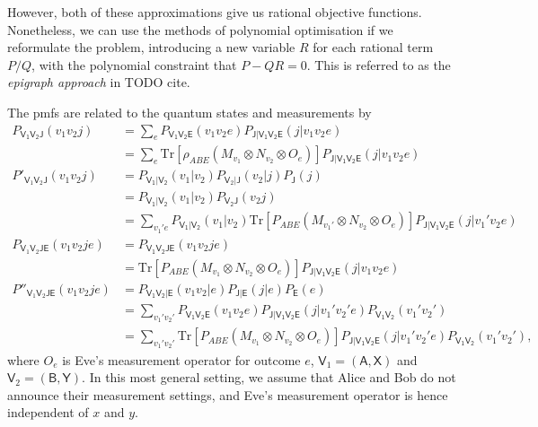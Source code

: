 \documentclass[10pt, a4paper]{article}
\numberwithin{equation}{section} %
\theoremstyle{definition}
\theoremstyle{plain}
\newcommand{\?}{\mathrel{?}} %
\newcommand{\Tr}{\mathrm{Tr}} %
\newcommand{\crv}[1]{\mathsf{#1}}
\begin{document}
    However, both of these approximations give us rational objective functions. Nonetheless, we can use the methods of polynomial optimisation if we reformulate the problem, introducing a new variable \(R\) for each rational term \(P/Q\), with the polynomial constraint that \(P - QR = 0\). This is referred to as the \emph{epigraph approach} in TODO cite.

    The pmfs are related to the quantum states and measurements by
    \begin{align}
      P_{\crv{V_1V_2J}}(v_1v_2j) &= \sum_{e}  P_{\crv{V_1V_2E}}(v_1v_2e) P_{\crv{J|V_1V_2E}}(j|v_1v_2e) \\
                                 &= \sum_{e} \Tr\left[\rho_{ABE} \left(M_{v_1} \otimes N_{v_2} \otimes O_e\right)\right] P_{\crv{J|V_1V_2E}}(j|v_1v_2e) \\
      P'_{\crv{V}_1\crv{V}_2\crv{J}}(v_1v_2j) &= P_{\crv{V_1|V_2}}(v_1|v_2) P_{\crv{V}_2|\crv{J}}(v_2|j) P_{\crv{J}}(j) \\
                                     &= P_{\crv{V_1|V_2}}(v_1|v_2) P_{\crv{V_2J}}(v_2j) \\
                                     &= \sum_{v_1' e} P_{\crv{V_1|V_2}}(v_1|v_2) \Tr\left[P_{ABE} \left(M_{v_1'} \otimes N_{v_2} \otimes O_e\right)\right] P_{\crv{J|V_1V_2E}}(j|v_1'v_2e) \\
      P_{\crv{V}_1\crv{V}_2\crv{JE}}(v_1v_2je) &= P_{\crv{V_1V_2JE}}(v_1v_2je) \\
                                         &= \Tr\left[P_{ABE} \left(M_{v_1} \otimes N_{v_2} \otimes O_e\right)\right] P_{\crv{J|V_1V_2E}}(j|v_1v_2e) \\
      P''_{\crv{V}_1\crv{V}_2\crv{JE}}(v_1v_2je) &= P_{\crv{V_1V_2|E}}(v_1v_2|e) P_{\crv{J|E}}(j|e) P_{\crv{E}}(e) \\
                                         &= \sum_{v_1' v_2'} P_{\crv{V_1V_2E}}(v_1v_2e) P_{\crv{J|V_1V_2E}}(j|v_1'v_2'e) P_{\crv{V_1V_2}}(v_1'v_2') \\
                                         &= \sum_{v_1' v_2'} \Tr\left[P_{ABE} \left(M_{v_1} \otimes N_{v_2} \otimes O_e\right)\right] P_{\crv{J|V_1V_2E}}(j|v_1'v_2'e) P_{\crv{V_1V_2}}(v_1'v_2'),
    \end{align}
    where \(O_e\) is Eve's measurement operator for outcome \(e\), \(\crv{V}_1 = (\crv{A,X})\) and \(\crv{V}_2 = (\crv{B,Y})\). In this most general setting, we assume that Alice and Bob do not announce their measurement settings, and Eve's measurement operator is hence independent of \(x\) and \(y\).
\end{document}
